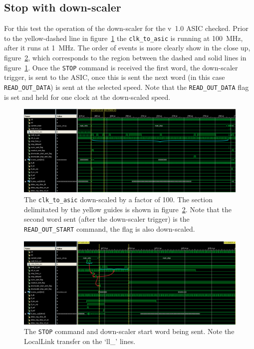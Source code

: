 \subsection{Stop with down-scaler} %
\label{sec:stop_downscaler}
For this test the operation of the down-scaler for the v~1.0 ASIC checked. Prior to the yellow-dashed line in figure~\ref{fig:isim_stop-downscaler} the \texttt{clk\_to\_asic} is running at 100~MHz, after it runs at 1~MHz. The order of events is more clearly show in the close up, figure~\ref{fig:isim_stop-downscaler-zoom}, which corresponds to the region between the dashed and solid lines in figure~\ref{fig:isim_stop-downscaler}. Once the \texttt{STOP} command is received the first word, the down-scaler trigger, is sent to the ASIC, once this is sent the next word (in this case \texttt{READ\_OUT\_DATA}) is sent at the selected speed. Note that the \texttt{READ\_OUT\_DATA} flag is set and held for one clock at the down-scaled speed.

\begin{figure}
  \centering
  \includegraphics[width=\textwidth]{images/isim/edited/stop-downscaler.png}
  \caption{The \texttt{clk\_to\_asic} down-scaled by a factor of 100. The section delimitated by the yellow guides is shown in figure~\ref{fig:isim_stop-downscaler-zoom}. Note that the second word sent (after the down-scaler trigger) is the \texttt{READ\_OUT\_START} command, the flag is also down-scaled.}
  \label{fig:isim_stop-downscaler}
\end{figure}
    
\begin{figure}
  \centering  
  \includegraphics[width=\textwidth]{images/isim/edited/stop-downscaler-zoom.png}
  \caption{The \texttt{STOP} command and down-scaler start word being sent. Note the LocalLink transfer on the `ll\_' lines.}
  \label{fig:isim_stop-downscaler-zoom}
\end{figure}
\clearpage
